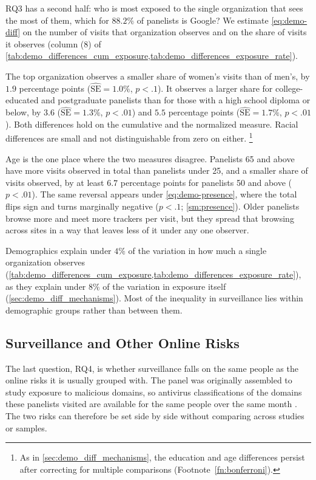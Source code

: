 \documentclass[12pt, letterpaper]{article}
\begin{document}
RQ3 has a second half: who is most exposed to the single organization that sees the most of them, which for $88.2\%$ of panelists is Google?
We estimate \cref{eq:demo-diff} on the number of visits that organization observes and on the share of visits it observes (column (8) of \cref{tab:demo_differences_cum_exposure,tab:demo_differences_exposure_rate}).
 
The top organization observes a smaller share of women's visits than of men's, by $1.9$ percentage points ($\widehat{\mathrm{SE}} = 1.0\%$, $p < .1$). It observes a larger share for college-educated and postgraduate panelists than for those with a high school diploma or below, by $3.6$ ($\widehat{\mathrm{SE}} = 1.3\%$, $p < .01$) and $5.5$ percentage points ($\widehat{\mathrm{SE}} = 1.7\%$, $p < .01$). Both differences hold on the cumulative and the normalized measure. Racial differences are small and not distinguishable from zero on either.%
\footnote{
    As in \cref{sec:demo_diff_mechanisms}, the education and age differences persist after correcting for multiple comparisons (Footnote~\ref{fn:bonferroni}).
}
 
Age is the one place where the two measures disagree. Panelists 65 and above have more visits observed in total than panelists under 25, and a smaller share of visits observed, by at least $6.7$ percentage points for panelists 50 and above ($p < .01$). The same reversal appears under \cref{eq:demo-presence}, where the total flips sign and turns marginally negative ($p < .1$; \cref{sm:presence}). Older panelists browse more and meet more trackers per visit, but they spread that browsing across sites in a way that leaves less of it under any one observer.
 
Demographics explain under $4\%$ of the variation in how much a single organization observes (\cref{tab:demo_differences_cum_exposure,tab:demo_differences_exposure_rate}), as they explain under $8\%$ of the variation in exposure itself (\cref{sec:demo_diff_mechanisms}).
Most of the inequality in surveillance lies within demographic groups rather than between them.

\subsection{Surveillance and Other Online Risks}
\label{sec:risk_divergence}
 
The last question, RQ4, is whether surveillance falls on the same people as the online risks it is usually grouped with. The panel was originally assembled to study exposure to malicious domains, so antivirus classifications of the domains these panelists visited are available for the same people over the same month \citep{bad_domains}. The two risks can therefore be set side by side without comparing across studies or samples.
 
\end{document}
